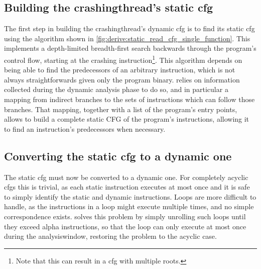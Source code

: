 \subsection[Building the \glsentrytext{crashingthread}'s static \glsentrytext{cfg}]{Building the \gls{crashingthread}'s static \gls{cfg}}
\label{sect:derive:build_static_cfg}

\noindent
The first step in building the \gls{crashingthread}'s dynamic
\gls{cfg} is to find its static \gls{cfg} using the algorithm shown in
\autoref{fig:derive:static_read_cfg_single_function}.  This implements
a depth-limited breadth-first search backwards through the program's
control flow, starting at the crashing instruction\footnote{Note that
  this can result in a \gls{cfg} with multiple roots.}.  This
algorithm depends on being able to find the predecessors of an
arbitrary instruction, which is not always straightforwards given only
the program binary.  {\Technique} relies on information collected
during the dynamic analysis phase to do so, and in particular a
mapping from indirect branches to the sets of instructions which can
follow those branches.  That mapping, together with a list of the
program's entry points, allows {\technique} to build a complete static
CFG of the program's instructions, allowing it to find an
instruction's predecessors when necessary.

\subsection[Converting the static \glsentrytext{cfg} to a dynamic one]{Converting the static \gls{cfg} to a dynamic one}
\label{sect:derive:handling_loops}

The static \gls{cfg} must now be converted to a dynamic one.  For
completely acyclic \glspl{cfg} this is trivial, as each static
instruction executes at most once and it is safe to simply identify
the static and dynamic instructions.  Loops are more difficult to
handle, as the instructions in a loop might execute multiple times,
and no simple correspondence exists.  {\Technique} solves this problem
by simply unrolling such loops until they exceed \gls{alpha}
instructions, so that the
loop can only execute at most once during the \gls{analysiswindow},
restoring the problem to the acyclic case.

